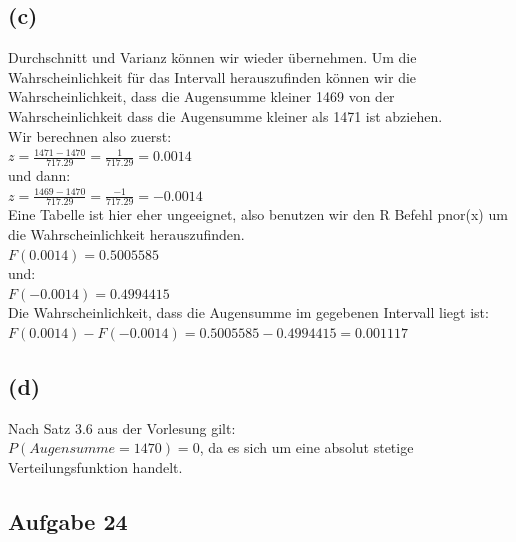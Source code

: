 \documentclass[a4paper]{scrartcl}
\begin{document}
\subsection*{(c)}
Durchschnitt und Varianz können wir wieder übernehmen.
Um die Wahrscheinlichkeit für das Intervall herauszufinden können wir die Wahrscheinlichkeit, dass die Augensumme kleiner 1469 von der Wahrscheinlichkeit dass die Augensumme kleiner als 1471 ist abziehen.\\
Wir berechnen also zuerst:\\
$z = \frac{1471 - 1470}{717.29} = \frac{1}{717.29} = 0.0014$\\
und dann:\\
$z = \frac{1469 - 1470}{717.29} = \frac{-1}{717.29} = -0.0014$\\
Eine Tabelle ist hier eher ungeeignet, also benutzen wir den R Befehl pnor(x) um die Wahrscheinlichkeit herauszufinden.\\
$F(0.0014) = 0.5005585$\\
und:\\
$F(-0.0014) = 0.4994415
$\\
Die Wahrscheinlichkeit, dass die Augensumme im gegebenen Intervall liegt ist:\\
$F(0.0014) - F(-0.0014) = 0.5005585 - 0.4994415 = 0.001117$


\subsection*{(d)}
Nach Satz 3.6 aus der Vorlesung gilt:\\
$P(Augensumme = 1470) = 0$, da es sich um eine absolut stetige Verteilungsfunktion handelt. 



\subsection*{Aufgabe 24}
\end{document}
